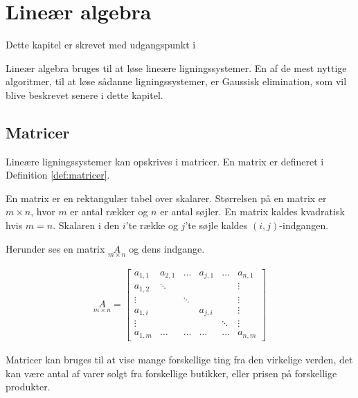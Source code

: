 \chapter{Lineær algebra}
Dette kapitel er skrevet med udgangspunkt i 

Lineær algebra bruges til at løse lineære ligningssystemer. 
En af de mest nyttige algoritmer, til at løse sådanne ligningssystemer, er Gaussisk elimination, som vil blive beskrevet senere i dette kapitel.

\section{Matricer}
Lineære ligningssystemer kan opskrives i matricer. 
En matrix er defineret i Definition \ref{def:matricer}.

\begin{defn}\label{def:matricer}
En matrix er en rektangulær tabel over skalarer. 
Størrelsen på en matrix er $m \times n$, hvor $m$ er antal rækker og $n$ er antal søjler. 
En matrix kaldes kvadratisk hvis $m=n$. 
Skalaren i den $i$'te række og $j$'te søjle kaldes $(i,j)$-indgangen.
\end{defn}

Herunder ses en matrix $\underset{m \times n}{A}$ og dens indgange.

\begin{align*}
\underset{m \times n}{A} = \begin{bmatrix}
	a_{1,1} & a_{2,1} & \dots & a_{j,1} & \dots & a_{n,1} \\
	a_{1,2} & \ddots  &       &         &       & \vdots \\
	\vdots  &         & \ddots &        &       & \vdots \\
	a_{1,i} &         &       & a_{j,i} &       & \vdots \\
	\vdots  &         &       &         & \ddots& \vdots \\
	a_{1,m} & \dots   & \dots & \dots   & \dots & a_{n,m} 
\end{bmatrix}
\end{align*}

Matricer kan bruges til at vise mange forskellige ting fra den virkelige verden, det kan være antal af varer solgt fra forskellige butikker, eller prisen på forskellige produkter. 

